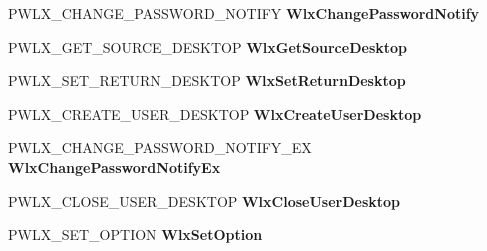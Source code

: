 \begin{DoxyCompactItemize}
\mbox{\label{struct___w_l_x___d_i_s_p_a_t_c_h___v_e_r_s_i_o_n__1__4_ae567238808d42dcb9cf36a3f640bde4f}} 
P\+W\+L\+X\+\_\+\+C\+H\+A\+N\+G\+E\+\_\+\+P\+A\+S\+S\+W\+O\+R\+D\+\_\+\+N\+O\+T\+I\+FY {\bfseries Wlx\+Change\+Password\+Notify}
\item 
\mbox{\label{struct___w_l_x___d_i_s_p_a_t_c_h___v_e_r_s_i_o_n__1__4_a1f3885c60f4bb4331cb2979be84669de}} 
P\+W\+L\+X\+\_\+\+G\+E\+T\+\_\+\+S\+O\+U\+R\+C\+E\+\_\+\+D\+E\+S\+K\+T\+OP {\bfseries Wlx\+Get\+Source\+Desktop}
\item 
\mbox{\label{struct___w_l_x___d_i_s_p_a_t_c_h___v_e_r_s_i_o_n__1__4_a10f11e9e42a9e05ee9e0d9ab6a8221ff}} 
P\+W\+L\+X\+\_\+\+S\+E\+T\+\_\+\+R\+E\+T\+U\+R\+N\+\_\+\+D\+E\+S\+K\+T\+OP {\bfseries Wlx\+Set\+Return\+Desktop}
\item 
\mbox{\label{struct___w_l_x___d_i_s_p_a_t_c_h___v_e_r_s_i_o_n__1__4_a21c393e11cda32381640206485ccdb23}} 
P\+W\+L\+X\+\_\+\+C\+R\+E\+A\+T\+E\+\_\+\+U\+S\+E\+R\+\_\+\+D\+E\+S\+K\+T\+OP {\bfseries Wlx\+Create\+User\+Desktop}
\item 
\mbox{\label{struct___w_l_x___d_i_s_p_a_t_c_h___v_e_r_s_i_o_n__1__4_a2b8dc4721a8360865760b83f20f15a33}} 
P\+W\+L\+X\+\_\+\+C\+H\+A\+N\+G\+E\+\_\+\+P\+A\+S\+S\+W\+O\+R\+D\+\_\+\+N\+O\+T\+I\+F\+Y\+\_\+\+EX {\bfseries Wlx\+Change\+Password\+Notify\+Ex}
\item 
\mbox{\label{struct___w_l_x___d_i_s_p_a_t_c_h___v_e_r_s_i_o_n__1__4_a2d25c3314bf01103ce60c830e25f1f34}} 
P\+W\+L\+X\+\_\+\+C\+L\+O\+S\+E\+\_\+\+U\+S\+E\+R\+\_\+\+D\+E\+S\+K\+T\+OP {\bfseries Wlx\+Close\+User\+Desktop}
\item 
\mbox{\label{struct___w_l_x___d_i_s_p_a_t_c_h___v_e_r_s_i_o_n__1__4_a3737fa4f3526a0d4303f220946ebfa5f}} 
P\+W\+L\+X\+\_\+\+S\+E\+T\+\_\+\+O\+P\+T\+I\+ON {\bfseries Wlx\+Set\+Option}
\item 
\mbox{\label{struct___w_l_x___d_i_s_p_a_t_c_h___v_e_r_s_i_o_n__1__4_aae5d06c1864d33bd7a36ed1bbe442db5}} 

\end{DoxyCompactItemize}
